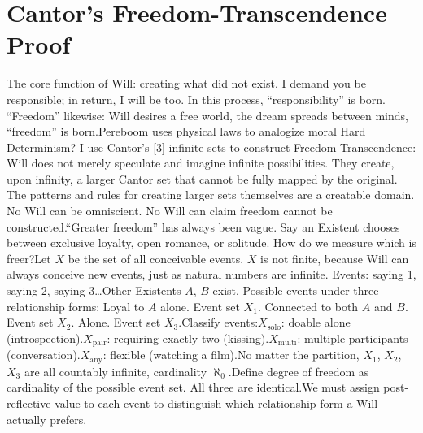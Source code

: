 \documentclass[11pt]{article}
\renewcommand{\\}[1][\mynewlineskip]{\oldnewline[#1]}
\begin{document}
\section{Cantor's Freedom-Transcendence Proof}
The core function of Will: creating what did not exist. I demand you be responsible; in return, I will be too. In this process, ``responsibility'' is born. ``Freedom'' likewise: Will desires a free world, the dream spreads between minds, ``freedom'' is born.\\
Pereboom uses physical laws to analogize moral Hard Determinism? I use Cantor's [3] infinite sets to construct Freedom-Transcendence: Will does not merely speculate and imagine infinite possibilities. They create, upon infinity, a larger Cantor set that cannot be fully mapped by the original. The patterns and rules for creating larger sets themselves are a creatable domain. No Will can be omniscient. No Will can claim freedom cannot be constructed.\\
``Greater freedom'' has always been vague. Say an Existent chooses between exclusive loyalty, open romance, or solitude. How do we measure which is freer?\\
Let $X$ be the set of all conceivable events. $X$ is not finite, because Will can always conceive new events, just as natural numbers are infinite. Events: saying 1, saying 2, saying 3\ldots\\
Other Existents $A$, $B$ exist. Possible events under three relationship forms:\\
1 Loyal to $A$ alone. Event set $X_1$.\\
2 Connected to both $A$ and $B$. Event set $X_2$.\\
3 Alone. Event set $X_3$.\\
Classify events:\\
$X_{\text{solo}}$: doable alone (introspection).\\
$X_{\text{pair}}$: requiring exactly two (kissing).\\
$X_{\text{multi}}$: multiple participants (conversation).\\
$X_{\text{any}}$: flexible (watching a film).\\
No matter the partition, $X_1$, $X_2$, $X_3$ are all countably infinite, cardinality $\aleph_0$.\\
Define degree of freedom as cardinality of the possible event set. All three are identical.\\
We must assign post-reflective value to each event to distinguish which relationship form a Will actually prefers.\\
\end{document}
